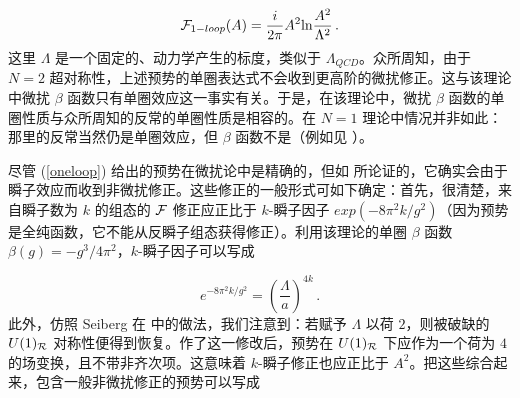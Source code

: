 \begin{equation}
{\cal F}_{1-loop}(A)=\frac{i}{2\pi} A^2 {\rm ln} \frac{A^2}{\Lambda^2}\,.
\label{oneloop}
\end{equation}
这里 $\Lambda$ 是一个固定的、动力学产生的标度，类似于 $\Lambda_{QCD}$。众所周知，由于 $N=2$ 超对称性，上述预势的单圈表达式不会收到更高阶的微扰修正。这与该理论中微扰 $\beta$ 函数只有单圈效应这一事实有关。于是，在该理论中，微扰 $\beta$ 函数的单圈性质与众所周知的反常的单圈性质是相容的。在 $N=1$ 理论中情况并非如此：那里的反常当然仍是单圈效应，但 $\beta$ 函数不是（例如见 \cite{SV1, SV2}）。


尽管 (\ref{oneloop}) 给出的预势在微扰论中是精确的，但如 \cite{Seiberg88} 所论证的，它确实会由于瞬子效应而收到非微扰修正。这些修正的一般形式可如下确定：首先，很清楚，来自瞬子数为 $k$ 的组态的 ${\cal F}$ 修正应正比于 $k$-瞬子因子 $exp(-8\pi^2k/g^2)$（因为预势是全纯函数，它不能从反瞬子组态获得修正）。利用该理论的单圈 $\beta$ 函数 $\beta(g)=-g^3/4\pi^2$，$k$-瞬子因子可以写成

$$
e^{-8\pi^2k/g^2} = \left(\frac{\Lambda}{a}\right)^{4k}\,.
$$
此外，仿照 Seiberg 在 \cite{Seiberg-n, Seiberg-poh} 中的做法，我们注意到：若赋予 $\Lambda$ 以荷 $2$，则被破缺的 $U(1)_{\cal R}$ 对称性便得到恢复。作了这一修改后，预势在 $U(1)_{\cal R}$ 下应作为一个荷为 $4$ 的场变换，且不带非齐次项。这意味着 $k$-瞬子修正也应正比于 $A^2$。把这些综合起来，包含一般非微扰修正的预势可以写成

